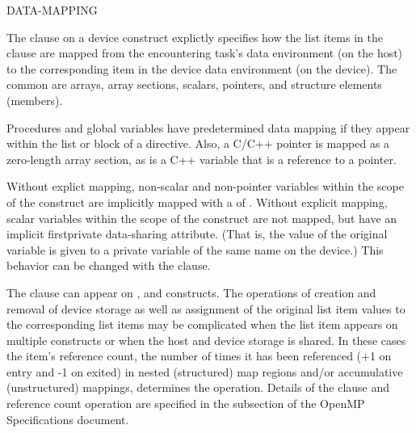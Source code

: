 DATA-MAPPING

The  clause on a device construct explictly specifies how the list items in
the clause are mapped from the encountering task's data environment (on the host)
to the corresponding item in the device data environment (on the device).
The common  are arrays, array sections, scalars, pointers, and
structure elements (members). 

Procedures and global variables have predetermined data mapping if they appear
within the list or block of a  directive. Also, a C/C++ pointer
is mapped as a zero-length array section, as is a C++ variable that is a reference to a pointer.

Without explict mapping, non-scalar and non-pointer variables within the scope of the 
construct are implicitly mapped with a  of .
Without explicit mapping, scalar variables within the scope of the 
construct are not mapped, but have an implicit firstprivate data-sharing
attribute. (That is, the value of the original variable is given to a private
variable of the same name on the device.) This behavior can be changed with
the  clause.

The  clause can appear on ,  and 
 constructs.  The operations of creation and
removal of device storage as well as assignment of the original list item 
values to the corresponding list items may be complicated when the list 
item appears on multiple constructs or when the host and device storage 
is shared. In these cases the item's reference count, the number of times
it has been referenced (+1 on entry and -1 on exited) in nested (structured)
map regions and/or accumulative (unstructured) mappings, determines the operation.
Details of the  clause and reference count operation are specified 
in the  subsection of the OpenMP Specifications document.
